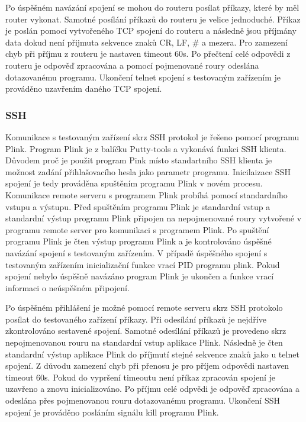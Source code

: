 Po úspěšném navázání spojení se mohou do routeru posílat příkazy, které by měl router vykonat. Samotné posílání příkazů do routeru je velice jednoduché. Příkaz je poslán pomocí vytvořeného TCP spojení do routeru a následně jsou příjmány data dokud není přijmuta sekvence znaků CR, LF, \# a mezera. Pro zamezení chyb při příjmu z routeru je nastaven timeout 60s. Po přečtení celé odpovědi z routeru je odpověď zpracována a pomocí pojmenované roury odeslána dotazovanému programu. Ukončení telnet spojení s testovaným zařízením je prováděno uzavřením daného TCP spojení.

\subsubsection{SSH}
Komunikace s testovaným zařízení skrz SSH protokol je řešeno pomocí programu Plink. Program Plink je z balíčku Putty-tools a vykonává funkci SSH klienta. Důvodem proč je použit program Pink místo standartního SSH klienta je možnost zadání přihlašovacího hesla jako parametr programu. Inicilaizace SSH spojení je tedy prováděna spuštěním programu Plink v novém procesu. Komunikace remote serveru s programem Plink probíhá pomocí standardního vstupu a výstupu. Před spuštěním programu Plink je standardní vstup a standardní výstup programu Plink připojen na nepojmenované roury vytvořené v programu remote server pro komunikaci s programem Plink. Po spuštění programu Plink je čten výstup programu Plink a je kontrolováno úspěšné navázání spojení s testovaným zařízením. V případě úspěšného spojení s testovaným zařízením inicializační funkce vrací PID programu plink. Pokud spojení nebylo úspěšně navázáno program Plink je ukončen a funkce vrací informaci o neúspěšném připojení.

Po úspěšném přihlášení je možné pomocí remote serveru skrz SSH protokolo posílat do testovaného zařízení příkazy. Při odesílání příkazů je nejdříve zkontrolováno sestavené spojení. Samotné odesílání příkazů je provedeno skrz nepojmenovanou rouru na standardní vstup aplikace Plink. Následně je čten standardní výstup aplikace Plink do příjmutí stejné sekvence znaků jako u telnet spojení. Z důvodu zamezení chyb při přenosu je pro příjem odpovědi nastaven timeout 60s. Pokud do vypršení timeoutu není příkaz zpracován spojení je uzavřeno a znovu inicializováno. Po příjmu celé odpvědi je odpověď zpracována a odeslána přes pojmenovanou rouru dotazovanému programu. Ukončení SSH spojení je prováděno posláním signálu kill programu Plink.


